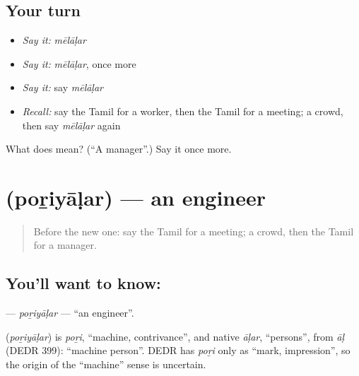 \subsection*{Your turn}
\begin{itemize}
\raggedright
  \item \emph{Say it:} \emph{mēlāḷar}
  \item \emph{Say it:} \emph{mēlāḷar}, once more
  \item \emph{Say it:} say \emph{mēlāḷar}
  \item \emph{Recall:} say the Tamil for a worker, then the Tamil for a meeting; a crowd, then say \emph{mēlāḷar} again
\end{itemize}

\begin{tcolorbox}[breakable,colback=teal!4,colframe=teal!35!black,title={Before you move on}]
What does  mean? (\textquotedblleft{}A manager\textquotedblright{}.) Say it once more.
\end{tcolorbox}
\section[\texorpdfstring{\ta{பொறியாளர்} (poṟiyāḷar)}{பொறியாளர் (poṟiyāḷar)}]{ (poṟiyāḷar) — an engineer}

\label{lesson:TA-C279-poriyalar}



\begin{quote}
Before the new one: say the Tamil for a meeting; a crowd, then the Tamil for a manager.
\end{quote}

\subsection*{You'll want to know: }
\textbf{} — \emph{poṟiyāḷar} — \textquotedblleft{}an engineer\textquotedblright{}.

\begin{cousinweb}
\textbf{} (\emph{poṟiyāḷar}) is \emph{poṟi}, \textquotedblleft{}machine, contrivance\textquotedblright{}, and native \emph{āḷar}, \textquotedblleft{}persons\textquotedblright{}, from \emph{āḷ} (DEDR 399): \textquotedblleft{}machine person\textquotedblright{}. DEDR has \emph{poṟi} only as \textquotedblleft{}mark, impression\textquotedblright{}, so the origin of the \textquotedblleft{}machine\textquotedblright{} sense is uncertain.
\end{cousinweb}

